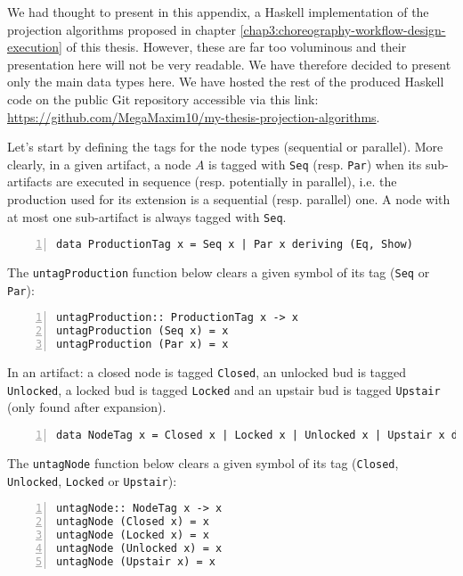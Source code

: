 \label{appendice1:algorithms-implementations}
\mySaveMarks

We had thought to present in this appendix, a Haskell implementation of the projection algorithms proposed in chapter \ref{chap3:choreography-workflow-design-execution} of this thesis. However, these are far too voluminous and their presentation here will not be very readable. We have therefore decided to present only the main data types here. We have hosted the rest of the produced Haskell code on the public Git repository accessible via this link: \url{https://github.com/MegaMaxim10/my-thesis-projection-algorithms}.


Let's start by defining the tags for the node types (sequential or parallel). More clearly, in a given artifact, a node $A$ is tagged with \Verb|Seq| (resp. \Verb|Par|) when its sub-artifacts are executed in sequence (resp. potentially in parallel), i.e. the production used for its extension is a sequential (resp. parallel) one. A node with at most one sub-artifact is always tagged with \Verb|Seq|.
\begin{Verbatim}[frame=lines, fontsize=\small, numbers=left, numbersep=8pt]
data ProductionTag x = Seq x | Par x deriving (Eq, Show)
\end{Verbatim}
The \Verb|untagProduction| function below clears a given symbol of its tag (\Verb|Seq| or \Verb|Par|):
\begin{Verbatim}[frame=lines, fontsize=\small, numbers=left, numbersep=8pt]
untagProduction:: ProductionTag x -> x
untagProduction (Seq x) = x
untagProduction (Par x) = x
\end{Verbatim}

In an artifact: a closed node is tagged \Verb|Closed|, an unlocked bud is tagged \Verb|Unlocked|, a locked bud is tagged \Verb|Locked| and an upstair bud is tagged \Verb|Upstair| (only found after expansion).
\begin{Verbatim}[frame=lines, fontsize=\small, numbers=left, numbersep=8pt]
data NodeTag x = Closed x | Locked x | Unlocked x | Upstair x deriving (Eq, Show)
\end{Verbatim}
The \Verb|untagNode| function below clears a given symbol of its tag (\Verb|Closed|, \Verb|Unlocked|, \Verb|Locked| or \Verb|Upstair|):
\begin{Verbatim}[frame=lines, fontsize=\small, numbers=left, numbersep=8pt]
untagNode:: NodeTag x -> x
untagNode (Closed x) = x
untagNode (Locked x) = x
untagNode (Unlocked x) = x
untagNode (Upstair x) = x
\end{Verbatim}

